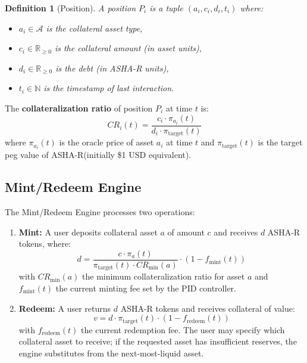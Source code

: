 \documentclass[11pt,a4paper]{article}
\newcommand{\ashares}{\textsc{ASHA-R}\xspace}
\newcommand{\RR}{\mathbb{R}}
\newcommand{\NN}{\mathbb{N}}
\newcommand{\CR}{\mathit{CR}}
\newtheorem{definition}{Definition}
\begin{document}
\begin{definition}[Position]
A position $P_i$ is a tuple $(a_i, c_i, d_i, t_i)$ where:
\begin{itemize}
  \item $a_i \in \mathcal{A}$ is the collateral asset type,
  \item $c_i \in \RR_{\geq 0}$ is the collateral amount (in asset units),
  \item $d_i \in \RR_{\geq 0}$ is the debt (in \ashares units),
  \item $t_i \in \NN$ is the timestamp of last interaction.
\end{itemize}
\end{definition}

The \textbf{collateralization ratio} of position $P_i$ at time $t$ is:
\begin{equation}
  \CR_i(t) = \frac{c_i \cdot \pi_{a_i}(t)}{d_i \cdot \pi_{\text{target}}(t)}
\end{equation}
where $\pi_{a_i}(t)$ is the oracle price of asset $a_i$ at time $t$ and $\pi_{\text{target}}(t)$ is the target peg value of \ashares (initially \$1 USD equivalent).

\subsection{Mint/Redeem Engine}

The Mint/Redeem Engine processes two operations:

\begin{enumerate}
  \item \textbf{Mint:} A user deposits collateral asset $a$ of amount $c$ and receives $d$ \ashares tokens, where:
  \begin{equation}
    d = \frac{c \cdot \pi_a(t)}{\pi_{\text{target}}(t) \cdot \CR_{\min}(a)} \cdot (1 - f_{\text{mint}}(t))
  \end{equation}
  with $\CR_{\min}(a)$ the minimum collateralization ratio for asset $a$ and $f_{\text{mint}}(t)$ the current minting fee set by the PID controller.

  \item \textbf{Redeem:} A user returns $d$ \ashares tokens and receives collateral of value:
  \begin{equation}
    v = d \cdot \pi_{\text{target}}(t) \cdot (1 - f_{\text{redeem}}(t))
  \end{equation}
  with $f_{\text{redeem}}(t)$ the current redemption fee.
  The user may specify which collateral asset to receive; if the requested asset has insufficient reserves, the engine substitutes from the next-most-liquid asset.
\end{enumerate}
\end{document}
